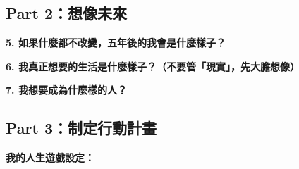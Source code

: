 \documentclass[12pt,a4paper]{article}
\begin{document}
\newpage

\subsection{Part 2：想像未來}

\textbf{5. 如果什麼都不改變，五年後的我會是什麼樣子？}
\begin{center}
\end{center}

\textbf{6. 我真正想要的生活是什麼樣子？（不要管「現實」，先大膽想像）}
\begin{center}
\end{center}

\textbf{7. 我想要成為什麼樣的人？}
\begin{center}
\end{center}

\newpage

\subsection{Part 3：制定行動計畫}

\textbf{我的人生遊戲設定：}
\end{document}
